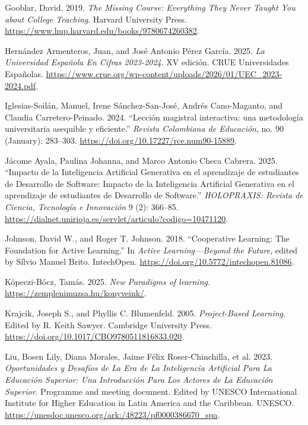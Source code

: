 \documentclass[
  11pt,
  a4paper,
  twoside]{scrreprt}
\newlength{\cslhangindent}
\newenvironment{CSLReferences}[2] %
 {\begin{list}{}{%
  \setlength{\itemindent}{0pt}
  \setlength{\leftmargin}{0pt}
  \setlength{\parsep}{0pt}
  \ifodd #1
   \setlength{\leftmargin}{\cslhangindent}
   \setlength{\itemindent}{-1\cslhangindent}
  \fi
  \setlength{\itemsep}{#2\baselineskip}}}
 {\end{list}}
\begin{document}
\begin{CSLReferences}{1}{1}
Gooblar, David. 2019. \emph{The {Missing} {Course}: {Everything} {They}
{Never} {Taught} {You} about {College} {Teaching}}. Harvard University
Press. \url{https://www.hup.harvard.edu/books/9780674260382}.

Hernández Armenteros, Juan, and José Antonio Pérez García. 2025.
\emph{La Universidad Española En Cifras 2023-2024}. XV edición. CRUE
Universidades Españolas.
\url{https://www.crue.org/wp-content/uploads/2026/01/UEC_2023-2024.pdf}.

Iglesias-Soilán, Manuel, Irene Sánchez-San-José, Andrés Cano-Maganto,
and Claudia Carretero-Peinado. 2024. {``Lección magistral interactiva:
una metodología universitaria asequible y eficiente.''} \emph{Revista
Colombiana de Educación}, no. 90 (January): 283--303.
\url{https://doi.org/10.17227/rce.num90-15889}.

Jácome Ayala, Paulina Johanna, and Marco Antonio Checa Cabrera. 2025.
{``Impacto de la Inteligencia Artificial Generativa en el aprendizaje de
estudiantes de Desarrollo de Software: Impacto de la Inteligencia
Artificial Generativa en el aprendizaje de estudiantes de Desarrollo de
Software.''} \emph{HOLOPRAXIS: Revista de Ciencia, Tecnología e
Innovación} 9 (2): 366--85.
\url{https://dialnet.unirioja.es/servlet/articulo?codigo=10471120}.

Johnson, David W., and Roger T. Johnson. 2018. {``Cooperative Learning:
The Foundation for Active Learning.''} In \emph{Active Learning---Beyond
the Future}, edited by Sílvio Manuel Brito. IntechOpen.
\url{https://doi.org/10.5772/intechopen.81086}.

Köpeczi-Bócz, Tamás. 2025. \emph{New Paradigms of learning}.
\url{https://zemplenimuzsa.hu/konyveink/}.

Krajcik, Joseph S., and Phyllis C. Blumenfeld. 2005. \emph{Project-Based
Learning}. Edited by R. Keith Sawyer. Cambridge University Press.
\url{https://doi.org/10.1017/CBO9780511816833.020}.

Liu, Bosen Lily, Diana Morales, Jaime Félix Roser-Chinchilla, et al.
2023. \emph{Oportunidades y Desafíos de La Era de La Inteligencia
Artificial Para La Educación Superior: Una Introducción Para Los Actores
de La Educación Superior}. Programme and meeting document. Edited by
UNESCO International Institute for Higher Education in Latin America and
the Caribbean. UNESCO.
\url{https://unesdoc.unesco.org/ark:/48223/pf0000386670_spa}.


\end{CSLReferences}
\end{document}

